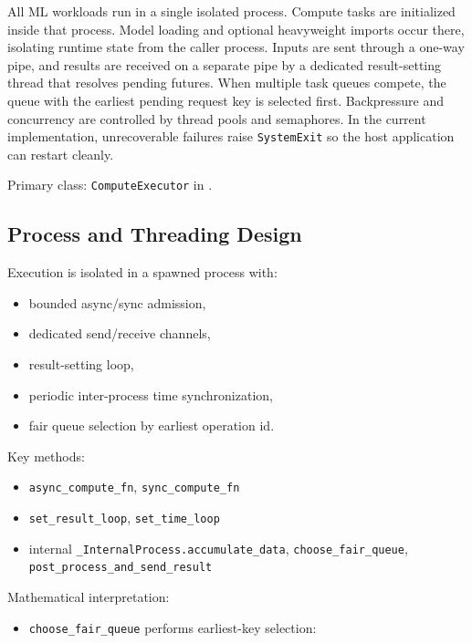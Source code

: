 \documentclass{article}
\providecommand{\tightlist}{\setlength{\itemsep}{0pt}\setlength{\parskip}{0pt}}
\begin{document}
All ML workloads run in a single isolated process. Compute tasks are
initialized inside that process. Model loading and optional heavyweight
imports occur there, isolating runtime state from the caller process.
Inputs are sent through a one-way pipe, and results are received on a
separate pipe by a dedicated result-setting thread that resolves pending
futures. When multiple task queues compete, the queue with the earliest
pending request key is selected first. Backpressure and concurrency are
controlled by thread pools and semaphores. In the current
implementation, unrecoverable failures raise \texttt{SystemExit} so the
host application can restart cleanly.

Primary class: \texttt{ComputeExecutor} in
.

\hypertarget{61-process-and-threading-design}{%
\subsection{Process and Threading
Design}\label{61-process-and-threading-design}}

Execution is isolated in a spawned process with:

\begin{itemize}
\tightlist
\item
  bounded async/sync admission,
\item
  dedicated send/receive channels,
\item
  result-setting loop,
\item
  periodic inter-process time synchronization,
\item
  fair queue selection by earliest operation id.
\end{itemize}

Key methods:

\begin{itemize}
\tightlist
\item
  \texttt{async\_compute\_fn}, \texttt{sync\_compute\_fn}
\item
  \texttt{set\_result\_loop}, \texttt{set\_time\_loop}
\item
  internal \texttt{\_InternalProcess.accumulate\_data},
  \texttt{choose\_fair\_queue},
  \texttt{post\_process\_and\_send\_result}
\end{itemize}

Mathematical interpretation:

\begin{itemize}
\tightlist
\item
  \texttt{choose\_fair\_queue} performs earliest-key selection:
\end{itemize}
\end{document}
